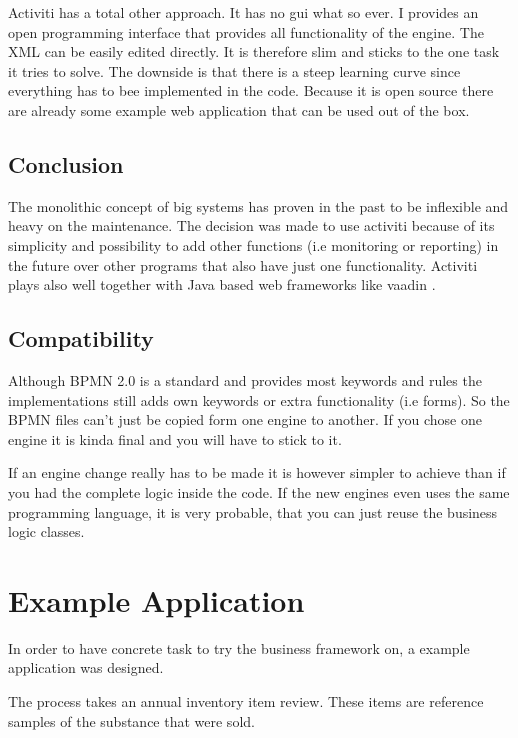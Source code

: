 \documentclass[paper=a4,twoside=false,BCOR=0mm,DIV=calc,fontsize=12pt]{scrartcl}
\begin{document}
Activiti has a total other approach. It has no gui what so ever. I provides an open programming interface that provides all functionality 
of the engine. The XML can be easily edited directly. It is therefore slim and sticks to the one task it tries to solve.
The downside is that there is a steep learning curve since everything has to bee implemented in the code. 
Because it is open source there are already some example web application that can be used out of the box. 

\subsection{Conclusion}
The monolithic concept of big systems has proven in the past to be inflexible and heavy on the maintenance. 
The decision was made to use activiti because of its simplicity and possibility to add other functions (i.e monitoring or reporting) in the future over other programs that also have just one functionality.
Activiti plays also well together with Java based web frameworks like vaadin \cite{vaadin}.


\subsection{Compatibility}
Although BPMN 2.0 is a standard and provides most keywords and rules the implementations still adds own keywords or extra functionality (i.e forms). So the BPMN files can't just be copied form one engine to another. If you chose one engine it is kinda final and you will have to stick to it.

If an engine change really has to be made it is however simpler to achieve than if you had the complete logic inside the code. If the new engines even
uses the same programming language, it is very probable, that you can just reuse the business logic classes. 


\section{Example Application}
In order to have concrete task to try the business framework on, a example application was designed.

The process takes an annual inventory item review. These items are reference samples of the substance that were sold.
\end{document}
